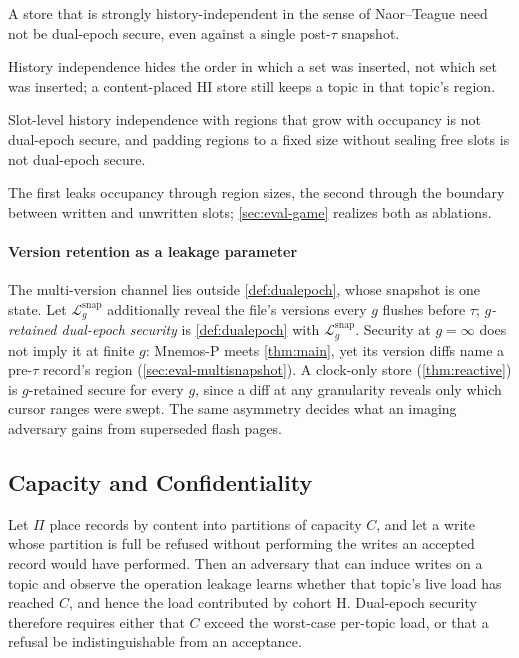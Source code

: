 \begin{proposition}
\label{prop:hi}
A store that is strongly history-independent in the sense of Naor--Teague need not be dual-epoch
secure, even against a single post-$\tau$ snapshot.
\end{proposition}
\noindent History independence hides the order in which a set was inserted, not which set was
inserted; a content-placed HI store still keeps a topic in that topic's region.

\begin{proposition}
\label{prop:seal}
Slot-level history independence with regions that grow with occupancy is not dual-epoch secure,
and padding regions to a fixed size without sealing free slots is not dual-epoch secure.
\end{proposition}
\noindent The first leaks occupancy through region sizes, the second through the boundary between
written and unwritten slots; \cref{sec:eval-game} realizes both as ablations.

\paragraph{Version retention as a leakage parameter} The multi-version channel lies outside
\cref{def:dualepoch}, whose snapshot is one state. Let $\mathcal{L}^{\mathrm{snap}}_g$ additionally
reveal the file's versions every $g$ flushes before $\tau$; \emph{$g$-retained dual-epoch security}
is \cref{def:dualepoch} with $\mathcal{L}^{\mathrm{snap}}_g$. Security at $g=\infty$ does not imply it
at finite $g$: Mnemos-P meets \cref{thm:main}, yet its version diffs name a pre-$\tau$ record's
region (\cref{sec:eval-multisnapshot}). A clock-only store (\cref{thm:reactive}) is $g$-retained
secure for every $g$, since a diff at any granularity reveals only which cursor ranges were swept.
The same asymmetry decides what an imaging adversary gains from superseded flash pages.

\subsection{Capacity and Confidentiality}
\label{sec:capacity-prop}

\begin{proposition}
\label{prop:capacity}
Let $\Pi$ place records by content into partitions of capacity $C$, and let a write whose partition
is full be refused without performing the writes an accepted record would have performed. Then an
adversary that can induce writes on a topic and observe the operation leakage learns whether that
topic's live load has reached $C$, and hence the load contributed by cohort H. Dual-epoch security
therefore requires either that $C$ exceed the worst-case per-topic load, or that a refusal be
indistinguishable from an acceptance.
\end{proposition}


